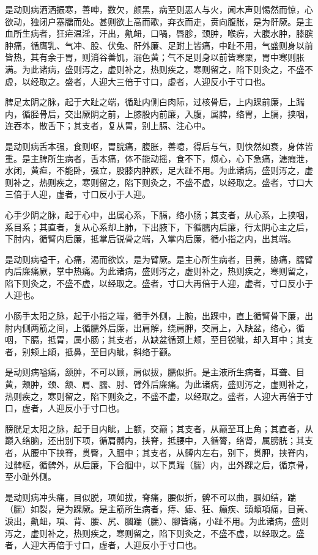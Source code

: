 \documentclass[a4paper,12pt,UTF8,twoside]{ctexbook}
\begin{document}
	是动则病洒洒振寒，善呻，数欠，颜黑，病至则恶人与火，闻木声则惕然而惊，心欲动，独闭户塞牖而处。甚则欲上高而歌，弃衣而走，贲向腹胀，是为骭厥。是主血所生病者，狂疟温淫，汗出，鼽衄，口喎，唇胗，颈肿，喉痹，大腹水肿，膝膑肿痛，循膺乳、气冲、股、伏兔、骭外廉、足跗上皆痛，中趾不用，气盛则身以前皆热，其有余于胃，则消谷善饥，溺色黄；气不足则身以前皆寒栗，胃中寒则胀满。为此诸病，盛则泻之，虚则补之，热则疾之，寒则留之，陷下则灸之，不盛不虚，以经取之。盛者，人迎大三倍于寸口，虚者，人迎反小于寸口也。
	
	脾足太阴之脉，起于大趾之端，循趾内侧白肉际，过核骨后，上内踝前廉，上踹内，循胫骨后，交出厥阴之前，上膝股内前廉，入腹，属脾，络胃，上膈，挟咽，连吞本，散舌下；其支者，复从胃，别上膈、注心中。
	
	是动则病舌本强，食则呕，胃脘痛，腹胀，善噫，得后与气，则快然如衰，身体皆重。是主脾所生病者，舌本痛，体不能动摇，食不下，烦心，心下急痛，溏瘕泄，水闭，黄疸，不能卧，强立，股膝内肿厥，足大趾不用。为此诸病，盛则泻之，虚则补之，热则疾之，寒则留之，陷下则灸之，不盛不虚，以经取之。盛者，寸口大三倍于人迎，虚者，寸口反小于人迎。
	
	心手少阴之脉，起于心中，出属心系，下膈，络小肠；其支者，从心系，上挟咽，系目系；其直者，复从心系却上肺，下出腋下，下循臑内后廉，行太阴心主之后，下肘内，循臂内后廉，抵掌后锐骨之端，入掌内后廉，循小指之内，出其端。
	
	是动则病嗌干，心痛，渴而欲饮，是为臂厥。是主心所生病者，目黄，胁痛，臑臂内后廉痛厥，掌中热痛。为此诸病，盛则泻之，虚则补之，热则疾之，寒则留之，陷下则灸之，不盛不虚，以经取之。盛者，寸口大再倍于人迎，虚者，寸口反小于人迎也。
	
	小肠手太阳之脉，起于小指之端，循手外侧，上腕，出踝中，直上循臂骨下廉，出肘内侧两筋之间，上循臑外后廉，出肩解，绕肩胛，交肩上，入缺盆，络心，循咽，下膈，抵胃，属小肠；其支者，从缺盆循颈上颊，至目锐眦，却入耳中；其支者，别颊上䪼，抵鼻，至目内眦，斜络于颧。
	
	是动则病嗌痛，颔肿，不可以顾，肩似拔，臑似折。是主液所生病者，耳聋、目黄，颊肿，颈、颔、肩、臑、肘、臂外后廉痛。为此诸病，盛则泻之，虚则补之，热则疾之，寒则留之，陷下则灸之，不盛不虚，以经取之。盛者，人迎大再倍于寸口，虚者，人迎反小于寸口也。
	
	膀胱足太阳之脉，起于目内眦，上额，交巅；其支者，从巅至耳上角；其直者，从巅入络脑，还出别下项，循肩髆内，挟脊，抵腰中，入循膂，络肾，属膀胱；其支者，从腰中下挟脊，贯臀，入腘中；其支者，从髆内左右，别下，贯胛，挟脊内，过髀枢，循髀外，从后廉，下合腘中，以下贯踹（腨）内，出外踝之后，循京骨，至小趾外侧。
	
	是动则病冲头痛，目似脱，项如拔，脊痛，腰似折，髀不可以曲，腘如结，踹（腨）如裂，是为踝厥。是主筋所生病者，痔、瘧、狂、癲疾、頭䪼項痛，目黃、淚出，鼽衄，項、背、腰、尻、膕踹（腨）、腳皆痛，小趾不用。为此诸病，盛则泻之，虚则补之，热则疾之，寒则留之，陷下则灸之，不盛不虚，以经取之。盛者，人迎大再倍于寸口，虚者，人迎反小于寸口也。
	
\end{document}
